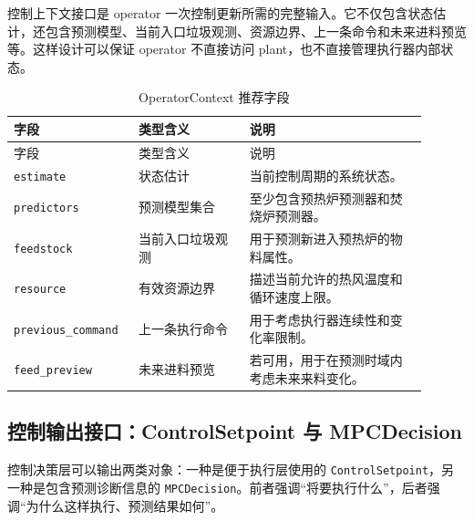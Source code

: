 \documentclass[UTF8,openany,zihao=-4,oneside]{ctexbook}
\begin{document}
控制上下文接口是 operator 一次控制更新所需的完整输入。它不仅包含状态估计，还包含预测模型、当前入口垃圾观测、资源边界、上一条命令和未来进料预览等。这样设计可以保证 operator 不直接访问 plant，也不直接管理执行器内部状态。

\begin{longtable}{@{}p{0.25\linewidth}p{0.25\linewidth}p{0.40\linewidth}@{}}
\caption{OperatorContext 推荐字段}\label{tab:operatorcontext}\\
\toprule
字段 & 类型含义 & 说明 \\
\midrule
\endfirsthead
\toprule
字段 & 类型含义 & 说明 \\
\midrule
\endhead
\texttt{estimate} & 状态估计 & 当前控制周期的系统状态。 \\
\texttt{predictors} & 预测模型集合 & 至少包含预热炉预测器和焚烧炉预测器。 \\
\texttt{feedstock} & 当前入口垃圾观测 & 用于预测新进入预热炉的物料属性。 \\
\texttt{resource} & 有效资源边界 & 描述当前允许的热风温度和循环速度上限。 \\
\texttt{previous\_command} & 上一条执行命令 & 用于考虑执行器连续性和变化率限制。 \\
\texttt{feed\_preview} & 未来进料预览 & 若可用，用于在预测时域内考虑未来来料变化。 \\
\bottomrule
\end{longtable}

\subsection{控制输出接口：ControlSetpoint 与 MPCDecision}\label{subsec:setpoint-decision}

控制决策层可以输出两类对象：一种是便于执行层使用的 \texttt{ControlSetpoint}，另一种是包含预测诊断信息的 \texttt{MPCDecision}。前者强调“将要执行什么”，后者强调“为什么这样执行、预测结果如何”。
\end{document}
